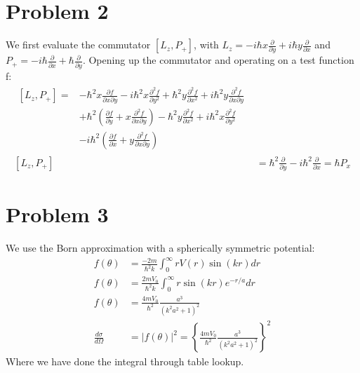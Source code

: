 \documentclass[a4paper,11pt]{article}
\numberwithin{equation}{section}
\begin{document}
\section{Problem 2}
We first evaluate the commutator $[L_z,P_+]$, with $L_z=-i\hbar x\frac{\partial}{\partial y}+i\hbar y\frac{\partial}{\partial x}$
and $P_+=-i\hbar \frac{\partial}{\partial x}+\hbar \frac{\partial}{\partial y}$.
Opening up the commutator and operating on a test function f:
\begin{align}
 \begin{split}
 [L_z,P_+] = &-\hbar^2x\frac{\partial f}{\partial x \partial y}-i\hbar^2x\frac{\partial^2f}{\partial y^2}+\hbar^2y\frac{\partial^2f}{\partial x^2}+i\hbar^2y\frac{\partial^2f}{\partial x \partial y}\\
  &+\hbar^2\left(\frac{\partial f}{\partial y}+x\frac{\partial^2f}{\partial x \partial y} \right)-\hbar^2y\frac{\partial^2 f}{\partial x^2}+i\hbar^2x\frac{\partial^2 f}{\partial y^2}\\
  &-i\hbar^2\left(\frac{\partial f}{\partial x}+y\frac{\partial^2 f}{\partial x \partial y} \right)
 \end{split}\\
 [L_z,P_+] &= \hbar^2\frac{\partial}{\partial y}-i\hbar^2\frac{\partial}{\partial x} = \hbar P_x
\end{align}

\section{Problem 3}
We use the Born approximation with a spherically symmetric potential:
\begin{align}
 f(\theta) &= \frac{-2m}{\hbar^2 k}\int_0^\infty rV(r)\sin{(kr)} dr\\
 f(\theta) &= \frac{2mV_0}{\hbar^2 k}\int_0^\infty r \sin{(kr)} e^{-r/a}dr\\
 f(\theta) &= \frac{4mV_0}{\hbar^2}\frac{a^3}{\left(k^2a^2+1 \right)^2}\\
 \frac{d\sigma}{d\Omega} &= |f(\theta)|^2 = \left\{\frac{4mV_0}{\hbar^2}\frac{a^3}{\left(k^2a^2+1 \right)^2} \right\}^2
\end{align}
Where we have done the integral through table lookup.
\end{document}
